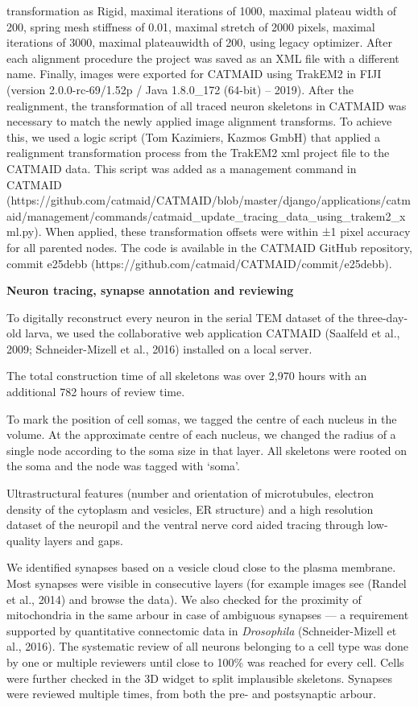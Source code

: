 \documentclass[
  11pt,
]{article}
\begin{document}
transformation as Rigid, maximal iterations of 1000, maximal plateau
width of 200, spring mesh stiffness of 0.01, maximal stretch of 2000
pixels, maximal iterations of 3000, maximal plateauwidth of 200, using
legacy optimizer. After each alignment procedure the project was saved
as an XML file with a different name. Finally, images were exported for
CATMAID using TrakEM2 in FIJI (version 2.0.0-rc-69/1.52p / Java
1.8.0\_172 (64-bit) -- 2019). After the realignment, the transformation
of all traced neuron skeletons in CATMAID was necessary to match the
newly applied image alignment transforms. To achieve this, we used a
logic script (Tom Kazimiers, Kazmos GmbH) that applied a realignment
transformation process from the TrakEM2 xml project file to the CATMAID
data. This script was added as a management command in CATMAID
(https://github.com/catmaid/CATMAID/blob/master/django/applications/catmaid/management/commands/catmaid\_update\_tracing\_data\_using\_trakem2\_xml.py).
When applied, these transformation offsets were within ±1 pixel accuracy
for all parented nodes. The code is available in the CATMAID GitHub
repository, commit e25debb
(https://github.com/catmaid/CATMAID/commit/e25debb).

\textbf{Neuron tracing, synapse annotation and reviewing}

To digitally reconstruct every neuron in the serial TEM dataset of the
three-day-old larva, we used the collaborative web application CATMAID
(Saalfeld et al., 2009; Schneider-Mizell et al., 2016) installed on a
local server.

The total construction time of all skeletons was over 2,970 hours with
an additional 782 hours of review time.

To mark the position of cell somas, we tagged the centre of each nucleus
in the volume. At the approximate centre of each nucleus, we changed the
radius of a single node according to the soma size in that layer. All
skeletons were rooted on the soma and the node was tagged with `soma'.

Ultrastructural features (number and orientation of microtubules,
electron density of the cytoplasm and vesicles, ER structure) and a high
resolution dataset of the neuropil and the ventral nerve cord aided
tracing through low-quality layers and gaps.

We identified synapses based on a vesicle cloud close to the plasma
membrane. Most synapses were visible in consecutive layers (for example
images see (Randel et al., 2014) and browse the data). We also checked
for the proximity of mitochondria in the same arbour in case of
ambiguous synapses --- a requirement supported by quantitative
connectomic data in \emph{Drosophila} (Schneider-Mizell et al., 2016).
The systematic review of all neurons belonging to a cell type was done
by one or multiple reviewers until close to 100\% was reached for every
cell. Cells were further checked in the 3D widget to split implausible
skeletons. Synapses were reviewed multiple times, from both the pre- and
postsynaptic arbour.
\end{document}
